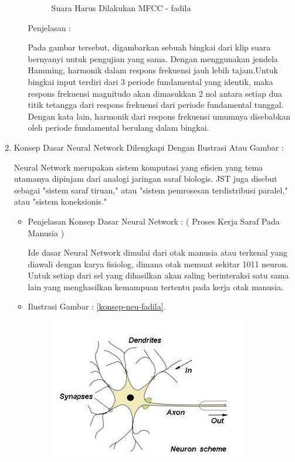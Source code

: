 \begin{enumerate}
\begin{itemize}
\begin{figure}[!hbtp]
\caption{Suara Harus Dilakukan MFCC - fadila}
\label{suara-mfcc-fadila}
\end{figure}
\par
\par Penjelasan :
\par Pada gambar tersebut, digambarkan sebuah bingkai dari klip suara bernyanyi untuk pengujian yang sama. Dengan menggunakan jendela Hamming, harmonik dalam respons frekuensi jauh lebih tajam.Untuk bingkai input terdiri dari 3 periode fundamental yang identik, maka respons frekuensi magnitudo akan dimasukkan 2 nol antara setiap dua titik tetangga dari respons frekuensi dari periode fundamental tunggal. Dengan kata lain, harmonik dari respons frekuensi umumnya disebabkan oleh periode fundamental berulang dalam bingkai. 
\par
\par
\end{itemize}
\par
\par
\item Konsep Dasar Neural Network Dilengkapi Dengan Ilustrasi Atau Gambar :
\par Neural Network merupakan sistem komputasi yang efisien yang tema utamanya dipinjam dari analogi jaringan saraf biologis. JST juga disebut sebagai "sistem saraf tiruan," atau "sistem pemrosesan terdistribusi paralel," atau "sistem koneksionis."
\begin{itemize}
\item Penjelasan Konsep Dasar Neural Network : ( Proses Kerja Saraf Pada Manusia )
\par Ide dasar Neural Network dimulai dari otak manusia atau terkenal yang diawali dengan karya fisiolog, dimana otak memuat sekitar 1011 neuron. Untuk setiap dari sel yang dihasilkan akan saling berinteraksi satu sama lain yang menghasilkan kemampuan tertentu pada kerja otak manusia.
\par
\item Ilustrasi Gambar : \ref{konsep-neu-fadila}.
\par
\begin{figure}[!hbtp]
\centering
\includegraphics[scale=0.2]{figures/konsep-neu-net-fadila.jpg}

\end{figure}
\end{itemize}
\end{enumerate}
